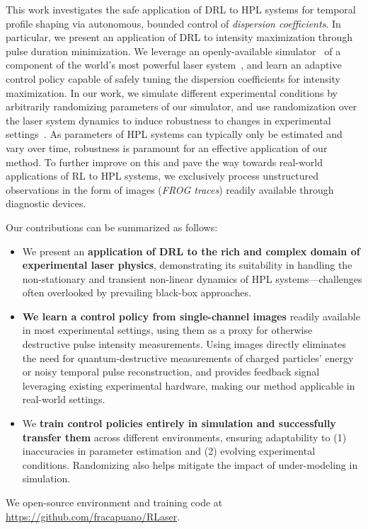 This work investigates the safe application of DRL to HPL systems for temporal profile shaping via autonomous, bounded control of \textit{dispersion coefficients}. 
In particular, we present an application of DRL to intensity maximization through pulse duration minimization. 
We leverage an openly-available simulator~\citep{capuano2023temporl} of a component of the world's most powerful laser system~\citep{batysta2014pulse}, and learn an adaptive control policy capable of safely tuning the dispersion coefficients for intensity maximization. 
In our work, we simulate different experimental conditions by arbitrarily randomizing parameters of our simulator, and use randomization over the laser system dynamics to induce robustness to changes in experimental settings~\citep{tiboni2023domain}.
As parameters of HPL systems can typically only be estimated and vary over time, robustness is paramount for an effective application of our method. To further improve on this and pave the way towards real-world applications of RL to HPL systems, we exclusively process unstructured observations in the form of images (\textit{FROG traces}) readily available through diagnostic devices. 

Our contributions can be summarized as follows:
\begin{itemize}
    \item We present an \textbf{application of DRL to the rich and complex domain of experimental laser physics}, demonstrating its suitability in handling the non-stationary and transient non-linear dynamics of HPL systems---challenges often overlooked by prevailing black-box approaches.
    \item \textbf{We learn a control policy from single-channel images} readily available in most experimental settings, using them as a proxy for otherwise destructive pulse intensity measurements. Using images directly eliminates the need for quantum-destructive measurements of charged particles' energy or noisy temporal pulse reconstruction, and provides feedback signal leveraging existing experimental hardware, making our method applicable in real-world settings.
    \item We \textbf{train control policies entirely in simulation and successfully transfer them} across different environments, ensuring adaptability to (1) inaccuracies in parameter estimation and (2) evolving experimental conditions. Randomizing also helps mitigate the impact of under-modeling in simulation.
\end{itemize}

We open-source environment and training code at \url{https://github.com/fracapuano/RLaser}.